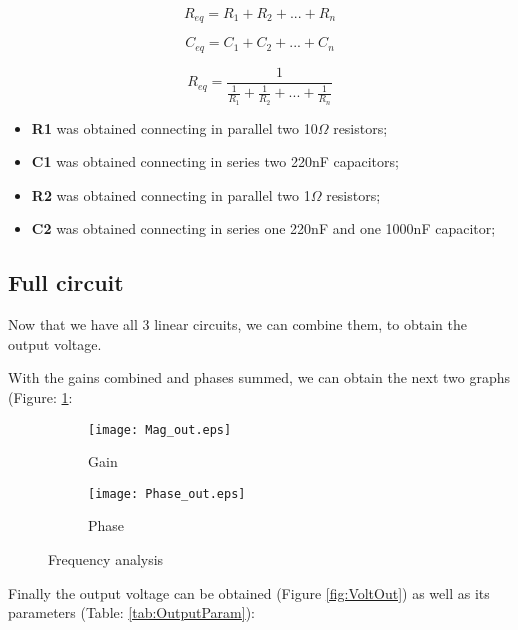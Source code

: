 \begin{equation}
    R_{eq}= R_1+R_2+...+R_n
    \label{eq:Rs}
\end{equation}

\begin{equation}
    C_{eq}= C_1+C_2+...+C_n
    \label{eq:Cp}
\end{equation}

\begin{equation}
    R_{eq}= \frac{1}{\frac{1}{R_1}+\frac{1}{R_2}+...+\frac{1}{R_n}}
    \label{eq:Rp}
\end{equation}

\begin{itemize}
    \item \textbf{R1} was obtained connecting in parallel two 10$\Omega$ resistors;
    \item \textbf{C1} was obtained connecting in series two 220nF capacitors;
    \item \textbf{R2} was obtained connecting in parallel two 1$\Omega$ resistors;
\item \textbf{C2} was obtained connecting in series one 220nF and one 1000nF capacitor;
\end{itemize}


\subsection{Full circuit}

\indent

Now that we have all 3 linear circuits, we can combine them, to obtain the output voltage.

With the gains combined and phases summed, we can obtain the next two graphs (Figure: \ref{fig:FreqA}:

\begin{figure}[H]
\centering
\begin{subfigure}{.49\textwidth}
  \centering
  \texttt{[image: Mag\_out.eps]}%
  \caption{Gain}
\end{subfigure}%
\begin{subfigure}{.49\textwidth}
  \centering
  \texttt{[image: Phase\_out.eps]}%
  \caption{Phase}
\end{subfigure}
\caption{Frequency analysis}
\label{fig:FreqA}
\end{figure}


Finally the output voltage can be obtained (Figure \ref{fig:VoltOut}) as well as its parameters (Table: \ref{tab:OutputParam}):

